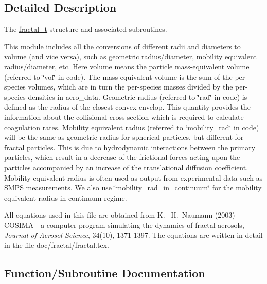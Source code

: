 \subsection{Detailed Description}
The \mbox{\hyperlink{structpmc__fractal_1_1fractal__t}{fractal\+\_\+t}} structure and associated subroutines. 

This module includes all the conversions of different radii and diameters to volume (and vice versa), such as geometric radius/diameter, mobility equivalent radius/diameter, etc. Here volume means the particle mass-\/equivalent volume (referred to \char`\"{}vol\char`\"{} in code). The mass-\/equivalent volume is the sum of the per-\/species volumes, which are in turn the per-\/species masses divided by the per-\/species densities in aero\+\_\+data. Geometric radius (referred to \char`\"{}rad\char`\"{} in code) is defined as the radius of the closest convex envelop. This quantity provides the information about the collisional cross section which is required to calculate coagulation rates. Mobility equivalent radius (referred to \char`\"{}mobility\+\_\+rad\char`\"{} in code) will be the same as geometric radius for spherical particles, but different for fractal particles. This is due to hydrodynamic interactions between the primary particles, which result in a decrease of the frictional forces acting upon the particles accompanied by an increase of the translational diffusion coefficient. Mobility equivalent radius is often used as output from experimental data such as S\+M\+PS measurements. We also use \char`\"{}mobility\+\_\+rad\+\_\+in\+\_\+continuum\char`\"{} for the mobility equivalent radius in continuum regime.

All equations used in this file are obtained from K.~-\/H.~Naumann (2003) C\+O\+S\+I\+MA -\/ a computer program simulating the dynamics of fractal aerosols, {\itshape Journal of Aerosol Science}, 34(10), 1371-\/1397. The equations are written in detail in the file {\ttfamily doc/fractal/fractal.\+tex}. 

\subsection{Function/\+Subroutine Documentation}
\mbox{\label{namespacepmc__fractal_a13aa17ef43c83973948ac8b325c0997b}} 
